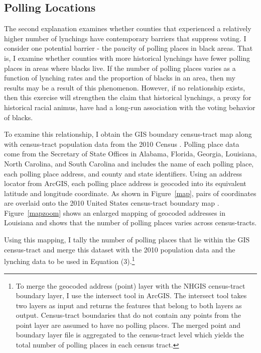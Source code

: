 \documentclass[AEJ, finalmode]{AEA}
\begin{document}
\subsection{Polling Locations}

The second explanation examines whether counties that experienced a relatively higher number of lynchings have contemporary barriers that suppress voting. I consider one potential barrier - the paucity of polling places in black areas. That is, I examine whether counties with more historical lynchings have fewer polling places in areas where blacks live. If the number of polling places varies as a function of lynching rates and the proportion of blacks in an area, then my results may be a result of this phenomenon. However, if no relationship exists, then this exercise will strengthen the claim that historical lynchings, a proxy for historical racial animus, have had a long-run association with the voting behavior of blacks.

To examine this relationship, I obtain the GIS boundary census-tract map along with census-tract population data from the 2010 Census \cite{ipumsnhgis}. Polling place data come from the Secretary of State Offices in Alabama, Florida, Georgia, Louisiana, North Carolina, and South Carolina and includes the name of each polling place, each polling place address, and county and state identifiers. Using an address locator from ArcGIS, each polling place address is geocoded into its equivalent latitude and longitude coordinate. As shown in Figure~\ref{map}, pairs of coordinates are overlaid onto the 2010 United States census-tract boundary map \cite{ipumsnhgis}. Figure~\ref{mapzoom} shows an enlarged mapping of geocoded addresses in Louisiana and shows that the number of polling places varies across census-tracts. 

Using this mapping, I tally the number of polling places that lie within the GIS census-tract and merge this dataset with the 2010 population data and the lynching data to be used in Equation (3).\footnote{To merge the geocoded address (point) layer with the NHGIS census-tract boundary layer, I use the intersect tool in ArcGIS. The intersect tool takes two layers as input and returns the features that belong to both layers as output. Census-tract boundaries that do not contain any points from the point layer are assumed to have no polling places. The merged point and boundary layer file is aggregated to the census-tract level which yields the total number of polling places in each census tract.}
\end{document}
